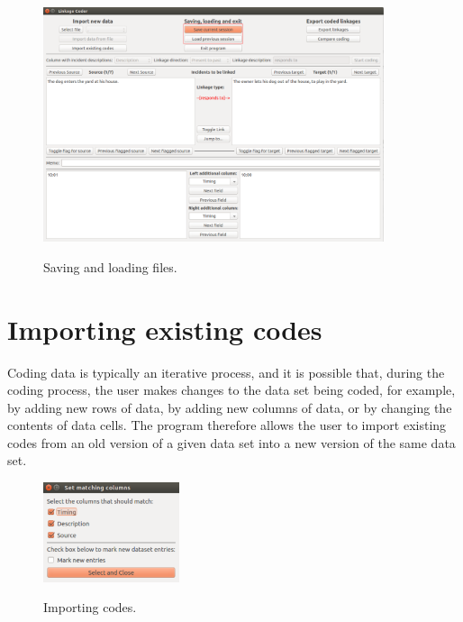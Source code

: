 \documentclass{memoir}
\begin{document}
\begin{figure}[h!]
  \centering
  \caption{Saving and loading files.}
  \includegraphics[width=100mm]{Screenshot_2.pdf}
  \label{fig:saveload}
\end{figure}

\section{Importing existing codes}
\label{sec:importingcodes}

Coding data is typically an iterative process, and it is possible that, during the coding process, the user makes changes to the data set being coded, for example, by adding new rows of data, by adding new columns of data, or by changing the contents of data cells. The program therefore allows the user to import existing codes from an old version of a given data set into a new version of the same data set. 

\begin{figure}[h!]
  \centering
  \caption{Importing codes.}
  \includegraphics[width=40mm]{Screenshot_3.pdf}
  \label{fig:importcodesfig}
\end{figure}
\end{document}
